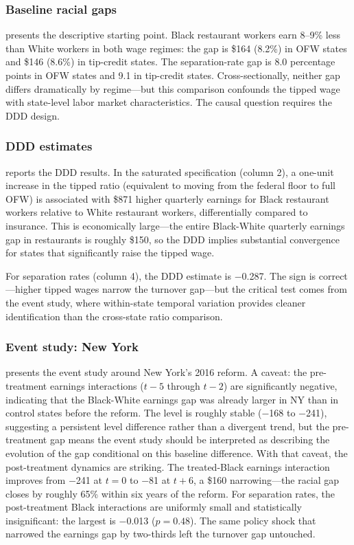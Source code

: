 \documentclass[12pt]{article}
\begin{document}
\subsubsection*{Baseline racial gaps}  presents the descriptive starting point. Black restaurant workers earn 8--9\% less than White workers in both wage regimes: the gap is \$164 (8.2\%) in OFW states and \$146 (8.6\%) in tip-credit states. The separation-rate gap is 8.0 percentage points in OFW states and 9.1 in tip-credit states. Cross-sectionally, neither gap differs dramatically by regime---but this comparison confounds the tipped wage with state-level labor market characteristics. The causal question requires the DDD design.



\subsubsection*{DDD estimates}  reports the DDD results. In the saturated specification (column 2), a one-unit increase in the tipped ratio (equivalent to moving from the federal floor to full OFW) is associated with \$871 higher quarterly earnings for Black restaurant workers relative to White restaurant workers, differentially compared to insurance. This is economically large---the entire Black-White quarterly earnings gap in restaurants is roughly \$150, so the DDD implies substantial convergence for states that significantly raise the tipped wage.

For separation rates (column 4), the DDD estimate is $-$0.287. The sign is correct---higher tipped wages narrow the turnover gap---but the critical test comes from the event study, where within-state temporal variation provides cleaner identification than the cross-state ratio comparison.



\subsubsection*{Event study: New York}  presents the event study around New York's 2016 reform. A caveat: the pre-treatment earnings interactions ($t-5$ through $t-2$) are significantly negative, indicating that the Black-White earnings gap was already larger in NY than in control states before the reform. The level is roughly stable ($-$168 to $-$241), suggesting a persistent level difference rather than a divergent trend, but the pre-treatment gap means the event study should be interpreted as describing the evolution of the gap conditional on this baseline difference. With that caveat, the post-treatment dynamics are striking. The treated-Black earnings interaction improves from $-$241 at $t=0$ to $-$81 at $t+6$, a \$160 narrowing---the racial gap closes by roughly 65\% within six years of the reform. For separation rates, the post-treatment Black interactions are uniformly small and statistically insignificant: the largest is $-$0.013 ($p = 0.48$). The same policy shock that narrowed the earnings gap by two-thirds left the turnover gap untouched.
\end{document}
